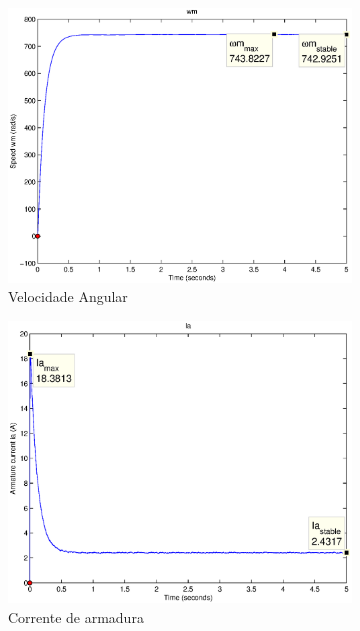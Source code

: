 \documentclass{article}
\begin{document}
\begin{figure}[H]
	\centering
	\begin{subfigure}[b]{0.49\linewidth}
		\includegraphics[width=\linewidth]{matlab/wm6}
		\caption{Velocidade Angular}
	\end{subfigure}
	\begin{subfigure}[b]{0.49\linewidth}
		\centering
		\includegraphics[width=\linewidth]{matlab/ia6}
		\caption{Corrente de armadura}
	\end{subfigure}
	\begin{subfigure}[b]{0.49\linewidth}
		\centering

\end{subfigure}
\end{figure}
\end{document}
